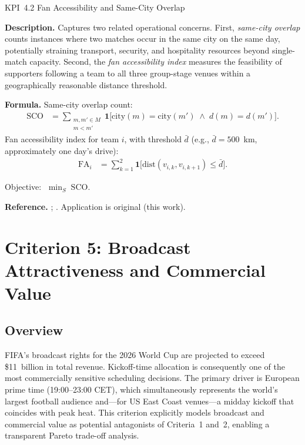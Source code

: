 \documentclass[12pt, letterpaper]{article}
\newcommand{\kpilabel}[1]{\noindent\textbf{#1}\enspace}
\begin{document}
\begin{kpibox}{KPI~4.2 \textendash{} Fan Accessibility and Same-City Overlap}

\kpilabel{Description.}
Captures two related operational concerns.  First,
\emph{same-city overlap} counts instances where two matches occur in
the same city on the same day, potentially straining transport, security,
and hospitality resources beyond single-match capacity.  Second, the
\emph{fan accessibility index} measures the feasibility of supporters
following a team to all three group-stage venues within a geographically
reasonable distance threshold.

\medskip
\kpilabel{Formula.}
Same-city overlap count:
\begin{align*}
  \mathrm{SCO} &= \sum_{\substack{m,m'\in M \\ m < m'}}
    \mathbf{1}\!\bigl[\mathrm{city}(m)=\mathrm{city}(m')
    \;\wedge\; d(m)=d(m')\bigr].
\end{align*}
Fan accessibility index for team $i$, with threshold $\bar{d}$ (e.g.,
$\bar{d}=500$~km, approximately one day's drive):
\begin{align*}
  \mathrm{FA}_i &= \sum_{k=1}^{2}
    \mathbf{1}\!\bigl[\mathrm{dist}(v_{i,k},v_{i,k+1})
    \leq \bar{d}\bigr].
\end{align*}
\vspace{-8pt}

\noindent
Objective: $\;\displaystyle\min_{S}\;\mathrm{SCO}$.

\medskip
\kpilabel{Reference.}
\citet{KendallEtAl2010}; \citet{RibeiroUrrutia2007}.
Application is original (this work).
\end{kpibox}

\section{Criterion 5: Broadcast Attractiveness and Commercial Value}

\subsection{Overview}

FIFA's broadcast rights for the 2026 World Cup are projected to exceed
\$11~billion in total revenue.  Kickoff-time allocation is consequently
one of the most commercially sensitive scheduling decisions.  The primary
driver is European prime time (19:00--23:00 CET), which simultaneously
represents the world's largest football audience and---for US East Coast
venues---a midday kickoff that coincides with peak heat.  This criterion
explicitly models broadcast and commercial value as potential antagonists
of Criteria~1 and~2, enabling a transparent Pareto trade-off analysis.
\end{document}

